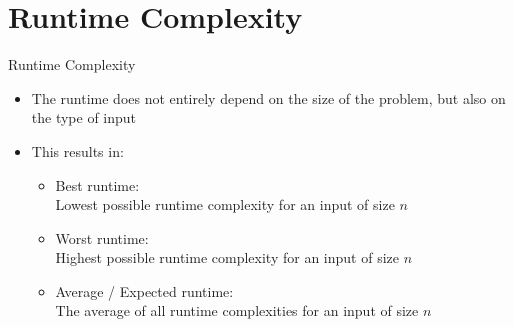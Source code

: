 
\section{Runtime Complexity}

\begin{frame}{Runtime Complexity}
  \begin{itemize}
    \item
      The runtime does not entirely depend on the size of the problem, but also
      on the type of input
    \item
      This results in:
    \begin{itemize}
      \item
        {\color{Mittel-Blau}Best runtime:}\\
        Lowest possible runtime complexity for an input of size $n$
      \item
        {\color{Mittel-Blau}Worst runtime:}\\
        Highest possible runtime complexity for an input of size $n$
      \item
        {\color{Mittel-Blau}Average / Expected runtime:}\\
        The average of all runtime complexities for an input of size $n$
    \end{itemize}
  \end{itemize}
\end{frame}


